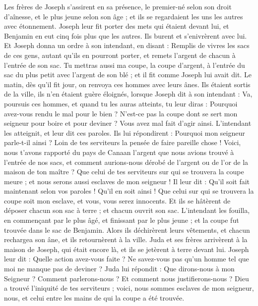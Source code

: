 \begin{multicols}{2}
Les frères de Joseph s’assirent en sa présence, le premier-né selon son droit d’aînesse, et le plus jeune selon son âge ; et ils se regardaient les uns les autres avec étonnement.
Joseph leur fit porter des mets qui étaient devant lui, et Benjamin en eut cinq fois plus que les autres. Ils burent et s’enivrèrent  avec lui.
\VerseOne{}Et Joseph donna un ordre à son intendant, en disant : Remplis de vivres les sacs de ces gens, autant qu'ils en pourront porter, et remets l'argent de chacun à l’entrée de son sac.
Tu mettras aussi ma coupe, la coupe d'argent, à l’entrée du sac du plus petit avec l'argent de son blé ; et il fit comme Joseph lui avait dit.
Le matin, dès qu'il fit jour, on renvoya ces hommes avec leurs ânes.
Ils étaient sortis de la ville, ils n’en étaient guère éloignés, lorsque Joseph dit à son intendant : Va, poursuis ces hommes, et quand tu les auras atteints, tu leur diras : Pourquoi avez-vous rendu le mal pour le bien ?
N'est-ce pas la coupe dont se sert mon seigneur pour boire et pour deviner ? Vous avez mal fait d’agir ainsi.
L’intendant les atteignit, et leur dit ces paroles.
Ils lui répondirent : Pourquoi mon seigneur parle-t-il ainsi ? Loin de tes serviteurs la pensée de faire pareille chose !
Voici, nous t'avons rapporté du pays de Canaan l'argent que nous avions trouvé à l’entrée de nos sacs, et comment aurions-nous dérobé de l'argent ou de l'or de la maison de ton maître ?
Que celui de tes serviteurs sur qui se trouvera la coupe meure ; et nous serons aussi esclaves de mon seigneur !
Il leur dit : Qu'il soit fait maintenant selon vos paroles ! Qu’il en soit ainsi ! Que celui sur qui se trouvera la coupe soit mon esclave, et vous, vous serez innocents.
Et ils se hâtèrent de déposer chacun son sac à terre ; et chacun ouvrit son sac.
L’intendant les fouilla, en commençant par le plus âgé, et finissant par le plus jeune ; et la coupe fut trouvée dans le sac de Benjamin.
Alors ils déchirèrent leurs vêtements, et chacun rechargea son âne, et ils retournèrent à la ville.
Juda et ses frères arrivèrent à la maison de Joseph, qui était encore là, et ils se jetèrent à terre devant lui.
Joseph leur dit : Quelle action avez-vous faite ? Ne savez-vous pas qu'un homme tel que moi ne manque pas de deviner ?
Juda lui répondit : Que dirons-nous à mon Seigneur ? Comment parlerons-nous ? Et comment nous justifierons-nous ? Dieu a trouvé l'iniquité de tes serviteurs ; voici, nous sommes esclaves de mon seigneur, nous, et celui entre les mains de qui la coupe a été trouvée.

\end{multicols}
